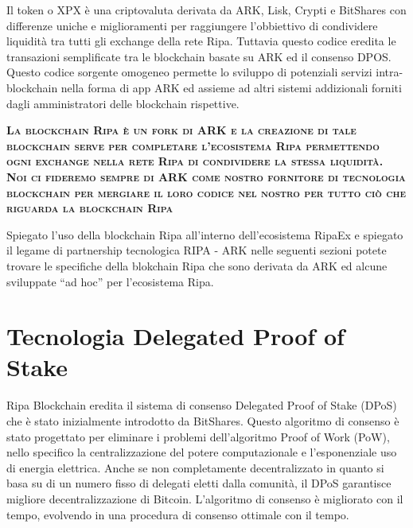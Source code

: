 \documentclass[11pt,fleqn,oneside]{book} %
\begin{document}
Il token \PHP o XPX è una criptovaluta derivata da ARK, Lisk, Crypti e BitShares con differenze uniche e miglioramenti per 
raggiungere l'obbiettivo di condividere liquidità tra tutti gli exchange della rete Ripa. Tuttavia questo codice eredita
le transazioni semplificate tra le blockchain basate su ARK ed il consenso DPOS. Questo codice sorgente omogeneo 
permette lo sviluppo di potenziali servizi intra-blockchain nella forma di app ARK ed assieme ad altri sistemi addizionali
forniti dagli amministratori delle blockchain rispettive.

\vspace{5mm}
\textsc{\textbf{La blockchain Ripa è un fork di ARK e la creazione di tale blockchain serve per completare l'ecosistema Ripa
permettendo ogni exchange nella rete Ripa di condividere la stessa liquidità. Noi ci fideremo sempre di ARK come nostro
fornitore di tecnologia blockchain per mergiare il loro codice nel nostro per tutto ciò che riguarda la blockchain Ripa}}

\vspace{5mm}

Spiegato l'uso della blockchain Ripa all'interno dell'ecosistema RipaEx e spiegato il legame di partnership tecnologica
RIPA - ARK nelle seguenti sezioni potete trovare le specifiche della blokchain Ripa che sono derivata da ARK ed alcune sviluppate 
``ad hoc'' per l'ecosistema Ripa.

\section{Tecnologia Delegated Proof of Stake}
Ripa Blockchain eredita il sistema di consenso Delegated Proof of Stake (DPoS) che è stato inizialmente
introdotto da BitShares. Questo algoritmo di consenso è stato progettato per eliminare i problemi dell'algoritmo
Proof of Work (PoW), nello specifico la centralizzazione del potere computazionale e l'esponenziale uso di energia
elettrica. Anche se non completamente decentralizzato in quanto si basa su di un numero fisso di delegati eletti
dalla comunità, il DPoS garantisce migliore decentralizzazione di Bitcoin. L'algoritmo di consenso è migliorato
con il tempo, evolvendo in una procedura di consenso ottimale con il tempo.\\
\end{document}
